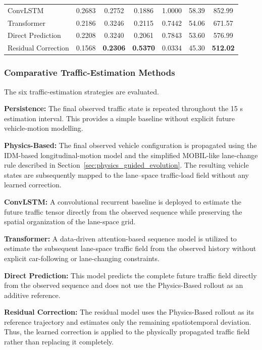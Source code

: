 \documentclass[journal]{IEEEtran}
\begin{document}
\begin{table}[!tbp]
{\begin{tabular}{lcccccc}
ConvLSTM
& 0.2683 & 0.2752 & 0.1886 & 1.0000 & 58.39 & 852.99 \\

Transformer
& 0.2186 & 0.3246 & 0.2115 & 0.7442 & 54.06 & 671.57 \\

Direct Prediction
& 0.2208 & 0.3240 & 0.2061 & 0.7843 & 53.60 & 576.99 \\

Residual Correction
& 0.1568 & \textbf{0.2306} & \textbf{0.5370}
& 0.0334 & 45.30 & \textbf{512.02} \\

\bottomrule
\end{tabular}%
}
\end{table}



\subsubsection{Comparative Traffic-Estimation Methods}

The six
traffic-estimation strategies are evaluated.

\textbf{Persistence:}
The final observed traffic state is repeated throughout the 15 s estimation
interval. This provides a simple baseline without explicit future
vehicle-motion modelling.

\textbf{Physics-Based:}
The final observed vehicle configuration is propagated using the IDM-based
longitudinal-motion model and the simplified MOBIL-like lane-change rule
described in Section~\ref{sec:physics_guided_evolution}. The resulting vehicle states are subsequently mapped
to the lane--space traffic-load field without any learned correction.

\textbf{ConvLSTM:}
A convolutional recurrent baseline is deployed to estimate the future traffic
tensor directly from the observed sequence while preserving the spatial
organization of the lane-space grid.

\textbf{Transformer:}
A data-driven attention-based sequence model is utilized to estimate the
subsequent lane-space traffic field from the observed history without explicit
car-following or lane-changing constraints.

\textbf{Direct Prediction:}
This model predicts the complete future traffic field directly from the
observed sequence and does not use the Physics-Based rollout as an additive
reference.

\textbf{Residual Correction:}
The residual model uses the Physics-Based rollout as its reference trajectory
and estimates only the remaining spatiotemporal deviation. Thus, the learned
correction is applied to the physically propagated traffic field rather than
replacing it completely.
\end{document}

